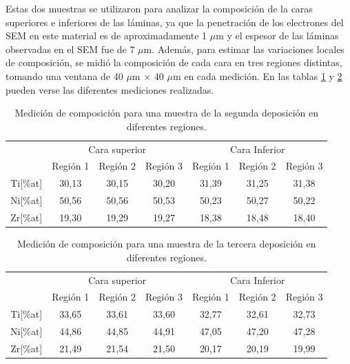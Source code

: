 \documentclass[12pt]{article}
\theoremstyle{definition}
\theoremstyle{remark}
\begin{document}
{Estas dos muestras se utilizaron para analizar la composición de la caras superiores e inferiores de las láminas, ya que la penetración de los electrones del SEM en este material es de aproximadamente 1 $\mu$m y el espesor de las láminas observadas en el SEM fue de 7 $\mu$m. Además, para estimar las variaciones locales de composición, se midió la composición de cada cara en tres regiones distintas, tomando una ventana de 40 $\mu$m $\times$ 40 $\mu$m en cada medición. En las tablas \ref{composition2} y \ref{composition3} pueden verse las diferentes mediciones realizadas.


\begin{table}[H]
\begin{tabular}{c|c|c|c|c|c|c|}
\cline{2-7}
\multicolumn{1}{l|}{} & \multicolumn{3}{c|}{Cara superior} & \multicolumn{3}{c|}{Cara Inferior} \\ \cline{2-7} 
\multicolumn{1}{l|}{} & Región 1 & Región 2 & Región 3 & Región 1 & Región 2 & Región 3 \\ \hline
\multicolumn{1}{|c|}{Ti{[}\%at{]}} & 30,13 & 30,15 & 30,20 & 31,39 & 31,25 & 31,38 \\ \hline
\multicolumn{1}{|c|}{Ni{[}\%at{]}} & 50,56 & 50,56 & 50,53 & 50,23 & 50,27 & 50,22 \\ \hline
\multicolumn{1}{|c|}{Zr{[}\%at{]}} & 19,30 & 19,29 & 19,27 & 18,38 & 18,48 & 18,40 \\ \hline
\end{tabular}
\caption{Medición de composición para una muestra de la segunda deposición en diferentes regiones.}
\label{composition2}
\end{table}

\begin{table}[H]
\begin{tabular}{c|c|c|c|c|c|c|}
\cline{2-7}
\multicolumn{1}{l|}{} & \multicolumn{3}{c|}{Cara superior} & \multicolumn{3}{c|}{Cara Inferior} \\ \cline{2-7} 
\multicolumn{1}{l|}{} & Región 1 & Región 2 & Región 3 & Región 1 & Región 2 & Región 3 \\ \hline
\multicolumn{1}{|c|}{Ti{[}\%at{]}} & 33,65 & 33,61 & 33,60 & 32,77 & 32,61 & 32,73 \\ \hline
\multicolumn{1}{|c|}{Ni{[}\%at{]}} & 44,86 & 44,85 & 44,91 & 47,05 & 47,20 & 47,28 \\ \hline
\multicolumn{1}{|c|}{Zr{[}\%at{]}} & 21,49 & 21,54 & 21,50 & 20,17 & 20,19 & 19,99 \\ \hline
\end{tabular}
\caption{Medición de composición para una muestra de la tercera deposición en diferentes regiones.}
\label{composition3}
\end{table}

}
\end{document}
